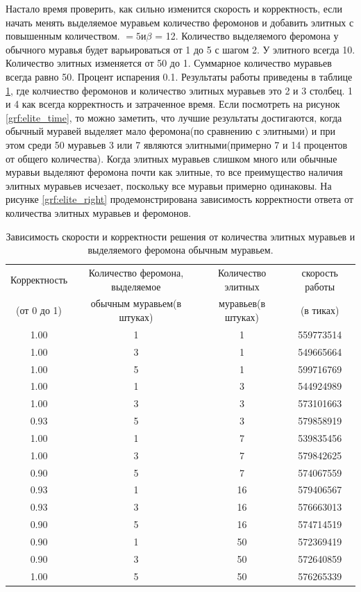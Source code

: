 \documentclass[a4paper, 14pt]{article}
\begin{document}
    Настало время проверить, как сильно изменится скорость и корректность, если начать менять выделяемое муравьем количество феромонов и добавить элитных с повышенным количеством. \alpha$ = 5 и \beta$ = 12. Количество выделяемого феромона у обычного муравья будет варьироваться от 1 до 5 с шагом 2. У элитного всегда 10. Количество элитных изменяется от 50 до 1. Суммарное количество муравьев всегда равно 50. Процент испарения 0.1. Результаты работы приведены в таблице \ref{tab:ants_elite}, где колчиество феромонов и количество элитных муравьев это 2 и 3 столбец. 1 и 4 как всегда корректность и затраченное время.  Если посмотреть на рисунок \ref{grf:elite_time}, то можно заметить, что лучшие результаты достигаются, когда обычный муравей выделяет мало феромона(по сравнению с элитными) и при этом среди 50 муравьев 3 или 7 являются элитными(примерно 7 и 14 процентов от общего количества). Когда элитных муравьев слишком много или обычные муравьи выделяют феромона почти как элитные, то все преимущество наличия элитных муравьев исчезает, поскольку все муравьи примерно одинаковы. На рисунке \ref{grf:elite_right} продемонстрирована зависимость корректности ответа от количества элитных муравьев и феромонов.
    
   \newpage
    \begin{table}[h]
        \caption{Зависимость скорости и корректности решения от количества элитных муравьев и выделяемого феромона обычным муравьем.}
            \begin{tabular}{ | c | c | c | c | }
                \hline
                 Корректность   &  Количество феромона, выделяемое   &  Количество элитных  &  скорость работы \\
                 (от 0 до 1) & обычным муравьем(в штуках) & муравьев(в штуках) & (в тиках) \\ \hline  
              1.00 &   1 &   1 &  559773514 \\
            1.00 &   3 &   1 &  549665664 \\
            1.00 &   5 &   1 &  599716769 \\
            1.00 &   1 &   3 &  544924989 \\
            1.00 &   3 &   3 &  573101663 \\
            0.93 &   5 &   3 &  579858919 \\
            1.00 &   1 &   7 &  539835456 \\
            1.00 &   3 &   7 &  579842625 \\
            0.90 &   5 &   7 &  574067559 \\
            0.93 &   1 &  16 &  579406567 \\
            0.93 &   3 &  16 &  576663013 \\
            0.90 &   5 &  16 &  574714519 \\
            0.90 &   1 &  50 &  572369419 \\
            0.90 &   3 &  50 &  572640859 \\
            1.00 &   5 &  50 &  576265339 \\
                \hline
            \end{tabular}
        \label{tab:ants_elite}
    \end{table} 
    
\end{document}

